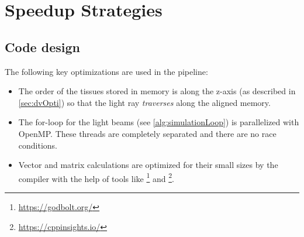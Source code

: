 \section{Speedup Strategies}\label{sec:sim:opt}
%
\subsection{Code design}
%
The following key optimizations are used in the pipeline:
\begin{itemize}
    \item The order of the tissues stored in memory is along the z-axis (as described in \cref{sec:dvOpti}) so that the light ray \textit{traverses} along the aligned memory.
    \item The for-loop for the light beams (see \cref{alg:simulationLoop}) is parallelized with \ac{OpenMP}.
    These threads are completely separated and there are no race conditions.
    \item Vector and matrix calculations are optimized for their small sizes by the compiler with the help of tools like \footnote{\url{https://godbolt.org/}} and \footnote{\url{https://cppinsights.io/}}.
\end{itemize}
%
%
%
